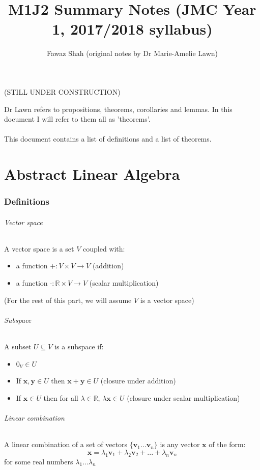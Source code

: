 \documentclass{article}
\title{M1J2 Summary Notes (JMC Year 1, 2017/2018 syllabus)}
\date{}
\author{Fawaz Shah (original notes by Dr Marie-Amelie Lawn)}
\newcommand{\R}{\mathbb{R}}
\renewcommand{\vec}[1]{\mathbf{#1}}
\begin{document}
\large
\maketitle
\begin{center}
(STILL UNDER CONSTRUCTION)
\end{center}
\noindent Dr Lawn refers to propositions, theorems, corollaries and lemmas. In this document I will refer to them all as 'theorems'.
\\\\
\noindent This document contains a list of definitions and a list of theorems.
\tableofcontents
\newpage
\part{Abstract Linear Algebra}

\section{Definitions}
\paragraph{Vector space}
A vector space is a set $ V $ coupled with:
\begin{itemize}
\item a function $ + : V \times V \to V $ (addition)
\item a function $ \cdot : \R \times V \to V $ (scalar multiplication)
\end{itemize}
(For the rest of this part, we will assume $ V $ is a vector space)
\paragraph{Subspace}
A subset $ U \subseteq V $ is a subspace if:
\begin{itemize}
\item $ 0_{V} \in U $
\item If $ \vec{x}, \vec{y} \in U $ then $ \vec{x + y} \in U $ (closure under addition)
\item If $ \vec{x} \in U $ then for all $ \lambda \in \R $, $ \lambda\vec{x} \in U $ (closure under scalar multiplication)
\end{itemize}
\paragraph{Linear combination}
A linear combination of a set of vectors $ \{\vec{v}_{1}...\vec{v}_{n}\} $ is any vector $ \vec{x} $ of the form:
\begin{equation}
\vec{x} = \lambda_{1}\vec{v}_{1} + \lambda_{2}\vec{v}_{2} + ... + \lambda_{n}\vec{v}_{n}
\end{equation}
for some real numbers $ \lambda_{1}...\lambda_{n} $
\end{document}
